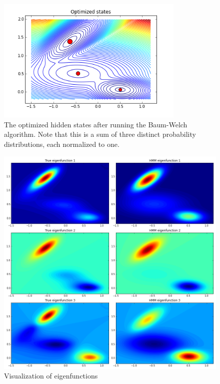 \documentclass[10pt]{article}
\begin{document}
\begin{figure}[htbp!]
	\centering
	\includegraphics[width=0.8\textwidth]{mix2.png}
	\caption{The optimized hidden states after running the Baum-Welch
	algorithm. Note that this is a sum of three distinct probability distributions,
	each normalized to one.}
	\label{mix2}
\end{figure}

\begin{figure}[htbp!]
	\centering
	\includegraphics[width=1.0\textwidth]{eigens.png}
	\caption{Visualization of eigenfunctions}
	\label{eigens}
\end{figure}
\end{document}
